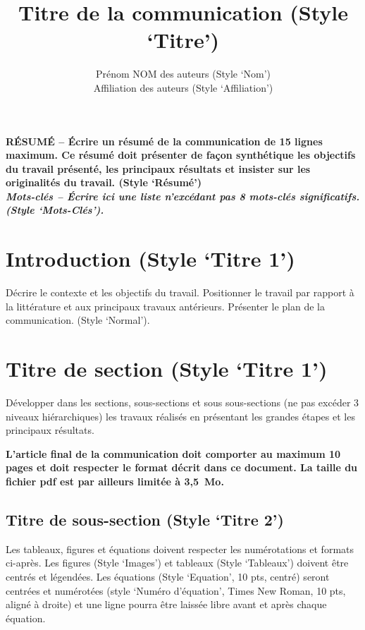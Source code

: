 \documentclass[a4paper,10pt,twocolumn]{article}
\title{
\fontsize{24pt}{24pt}\selectfont
Titre de la communication (Style ‘Titre’)
}
\author{
\fontsize{11pt}{11pt}\selectfont
Prénom NOM des auteurs (Style ‘Nom’)\\
\fontsize{10pt}{10pt}\selectfont
Affiliation des auteurs (Style ‘Affiliation’)
}
\date{}
\begin{document}
\maketitle
\thispagestyle{fancy}


\fontsize{9pt}{9pt}\selectfont
\textbf{RÉSUMÉ -- Écrire un résumé de la communication de 15 lignes maximum. Ce résumé doit présenter de façon synthétique les objectifs du travail présenté, les principaux résultats et insister sur les originalités du travail. (Style ‘Résumé’)}\\

\textbf{\textit{Mots-clés -- Écrire ici une liste n’excédant pas 8 mots-clés significatifs. (Style ‘Mots-Clés’).}}

\fontsize{10pt}{10pt}\selectfont


\section{Introduction  (Style ‘Titre 1’)}

Décrire le contexte et les objectifs du travail. Positionner le travail par rapport à la littérature et aux principaux travaux antérieurs. Présenter le plan de la communication. (Style ‘Normal’).

\section{Titre de section (Style ‘Titre 1’)}

Développer dans les sections, sous-sections et sous sous-sections (ne pas excéder 3 niveaux hiérarchiques) les travaux réalisés en présentant les grandes étapes et les principaux résultats.

\textbf{L’article final de la communication doit comporter au maximum 10 pages et doit respecter le format décrit dans ce document. La taille du fichier pdf est par ailleurs limitée à 3,5~Mo.}

\subsection{Titre de sous-section (Style ‘Titre 2’)}

Les tableaux, figures et équations doivent respecter les numérotations et formats ci-après. Les figures (Style ‘Images’) et tableaux (Style ‘Tableaux’) doivent être centrés et légendées. Les équations (Style ‘Equation’, 10 pts, centré) seront centrées et numérotées (style ‘Numéro d’équation’, Times New Roman, 10 pts, aligné à droite) et une ligne pourra être laissée libre avant et après chaque équation.
\end{document}
